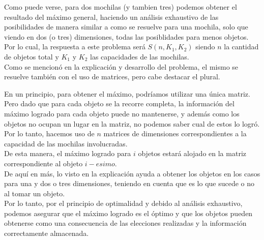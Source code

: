 Como puede verse, para dos mochilas (y tambien tres) podemos obtener el resultado del máximo general, haciendo un análisis exhaustivo de las posibilidades de manera similar a como se resuelve para una mochila, solo que viendo en dos (o tres) dimensiones, todas las posiblidades para menos objetos.\\
Por lo cual, la respuesta a este problema será $S(n, K_1, K_2)$ siendo $n$ la cantidad de objetos total y $K_1$ y $K_2$ las capacidades de las mochilas.\\

Como se mencionó en la explicación y desarrollo del problema, el mismo se resuelve tambi\'en con el uso de matrices, pero cabe destacar el plural. 

En un principio, para obtener el máximo, podr\'iamos utilizar una única matriz. Pero dado que para cada objeto se la recorre completa, la información del máximo logrado para cada objeto puede no mantenerse, y además como los objetos no ocupan un lugar en la matriz, no podemos saber cual de estos lo logró.\\
Por lo tanto, hacemos uso de $n$ matrices de dimensiones correspondientes a la capacidad de las mochilas involucradas. \\

De esta manera, el máximo logrado para $i$ objetos estará alojado en la matriz correspondiente al objeto $i-esimo$.\\

De aquí en más, lo visto en la explicación ayuda a obtener los objetos en los casos para una y dos o tres dimensiones, teniendo en cuenta que es lo que sucede o no al tomar un objeto. \\

Por lo tanto, por el principio de optimalidad y debido al análisis exhaustivo, podemos asegurar que el máximo logrado es el \'optimo y que los objetos pueden obtenerse como una consecuencia de las elecciones realizadas y la información correctamente almacenada.


